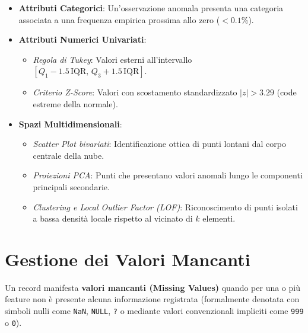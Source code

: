 \begin{itemize}
    \item \textbf{Attributi Categorici}: Un'osservazione anomala presenta una categoria associata a una frequenza empirica prossima allo zero ($< 0.1\%$).
    \item \textbf{Attributi Numerici Univariati}:
    \begin{itemize}[noitemsep]
        \item \textit{Regola di Tukey}: Valori esterni all'intervallo $[Q_1 - 1.5\,\text{IQR},\, Q_3 + 1.5\,\text{IQR}]$.
        \item \textit{Criterio Z-Score}: Valori con scostamento standardizzato $|z| > 3.29$ (code estreme della normale).
    \end{itemize}
    \item \textbf{Spazi Multidimensionali}:
    \begin{itemize}[noitemsep]
        \item \textit{Scatter Plot bivariati}: Identificazione ottica di punti lontani dal corpo centrale della nube.
        \item \textit{Proiezioni PCA}: Punti che presentano valori anomali lungo le componenti principali secondarie.
        \item \textit{Clustering e Local Outlier Factor (LOF)}: Riconoscimento di punti isolati a bassa densità locale rispetto al vicinato di $k$ elementi.
    \end{itemize}
\end{itemize}

\section{Gestione dei Valori Mancanti}
\label{sec:dm-missing-values-intro}

Un record manifesta \textbf{valori mancanti (Missing Values)} quando per una o più feature non è presente alcuna informazione registrata (formalmente denotata con simboli nulli come \texttt{NaN}, \texttt{NULL}, \texttt{?} o mediante valori convenzionali impliciti come \texttt{999} o \texttt{0}).

